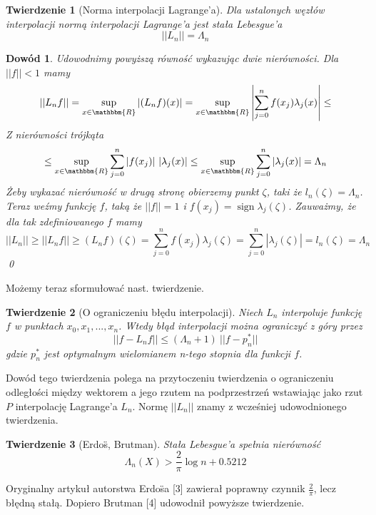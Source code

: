 \documentclass{article}
\newtheorem{twr}{Twierdzenie}
\newtheorem*{dd}{Dowód}
\DeclareMathOperator{\sign}{sign}
\begin{document}
\begin{twr}[Norma interpolacji Lagrange'a]
Dla ustalonych węzłów interpolacji normą interpolacji Lagrange'a jest stała Lebesgue'a
\begin{equation*}
||L_n|| = \Lambda_n
\end{equation*}
\end{twr}
\begin{dd}
\normalfont
Udowodnimy powyższą równość wykazując dwie nierówności. Dla $||f|| < 1$ mamy
\begin{equation*}
||L_n f|| = \sup_{x \in \mathbbm{R}} |(L_n f)(x)| = \sup_{x \in \mathbbm{R}} \left| \sum_{j = 0}^n f(x_j)\lambda_j(x)\right| \le
\end{equation*}
Z nierówności trójkąta
\begin{equation*}
\le \sup_{x \in \mathbbm{R}} \sum_{j = 0}^n |f(x_j)| \ |\lambda_j(x)| \le \sup_{x \in \mathbbm{R}} \sum_{j = 0}^n |\lambda_j(x)| = \Lambda_n
\end{equation*}
Żeby wykazać nierówność w drugą stronę obierzemy punkt $\zeta$, taki że $l_n(\zeta) = \Lambda_n$. Teraz weźmy funkcję $f$, taką że $||f|| = 1$ i $f(x_j) = \sign \lambda_j(\zeta)$. Zauważmy, że dla tak zdefiniowanego $f$ mamy
\begin{equation*}
||L_n|| \ge ||L_n f|| \ge (L_n f)(\zeta) = \sum_{j = 0}^n f(x_j)\lambda_j(\zeta) = \sum_{j = 0}^n |\lambda_j(\zeta)| = l_n(\zeta) = \Lambda_n
\end{equation*}
\qed
\end{dd}
Możemy teraz sformułować nast. twierdzenie.
\begin{twr}[O ograniczeniu błędu interpolacji]
Niech $L_n$ interpoluje funkcję $f$ w punktach $x_0, x_1, ..., x_n$. Wtedy błąd interpolacji można ograniczyć z góry przez 
\begin{equation}
||f - L_n f|| \le (\Lambda_n + 1) \ ||f - p_n^{*}||
\end{equation}
gdzie $p_n^{*}$ jest optymalnym wielomianem n-tego stopnia dla funkcji $f$.
\end{twr}
Dowód tego twierdzenia polega na przytoczeniu twierdzenia o ograniczeniu odległości między wektorem a jego rzutem na podprzestrzeń wstawiając jako rzut $P$ interpolację Lagrange'a $L_n$. Normę $||L_n||$ znamy z wcześniej udowodnionego twierdzenia.\\

\begin{twr}[Erdo\"s, Brutman] Stała Lebesgue'a spełnia nierówność
\begin{equation*}
\Lambda_n(X) > \frac{2}{\pi}\log n + 0.5212
\end{equation*}
\end{twr}
Oryginalny artykuł autorstwa Erdo\"sa [3] zawierał poprawny czynnik $\frac{2}{\pi}$, lecz błędną stałą. Dopiero Brutman [4] udowodnił powyższe twierdzenie.
\end{document}
